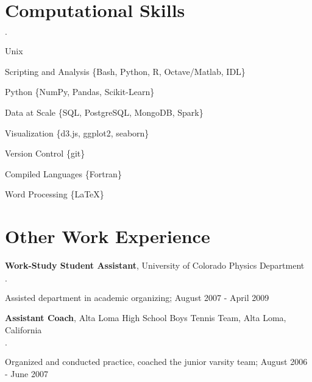 \documentclass[margin,line]{res}
\newenvironment{list2}{
  \begin{list}{$\cdot$}{%
      \setlength{\itemsep}{0in}
      \setlength{\parsep}{0in} \setlength{\parskip}{0in}
      \setlength{\topsep}{0in} \setlength{\partopsep}{0in} 
      \setlength{\leftmargin}{0.2in}}}{\end{list}}
\newenvironment{list3}{
  \begin{list}{$\cdot$}{%
      \setlength{\itemsep}{0in}
      \setlength{\parsep}{0in} \setlength{\parskip}{0in}
      \setlength{\topsep}{0in} \setlength{\partopsep}{0in} 
      \setlength{\leftmargin}{0.1in}}}{\end{list}}
\begin{document}
\begin{resume}



\section{\sc Computational Skills}

\begin{list3}
\item Unix
\item Scripting and Analysis \{Bash, Python, R, Octave/Matlab, IDL\}
\item Python \{NumPy, Pandas, Scikit-Learn\}
\item Data at Scale \{SQL, PostgreSQL, MongoDB, Spark\}
\item Visualization \{d3.js, ggplot2, seaborn\}
\item Version Control \{git\}
\item Compiled Languages \{Fortran\}
\item Word Processing \{\LaTeX\}
\end{list3}


\section{\sc Other Work Experience}

{\bf Work-Study Student Assistant}, University of Colorado Physics Department
\begin{list2}
\item Assisted department in academic organizing; August 2007 - April 2009
\end{list2}

{\bf Assistant Coach}, Alta Loma High School Boys Tennis Team, Alta Loma, California
\begin{list2}
\item Organized and conducted practice, coached the junior varsity team; August 2006 - June 2007
\end{list2}


\end{resume}
\end{document}
